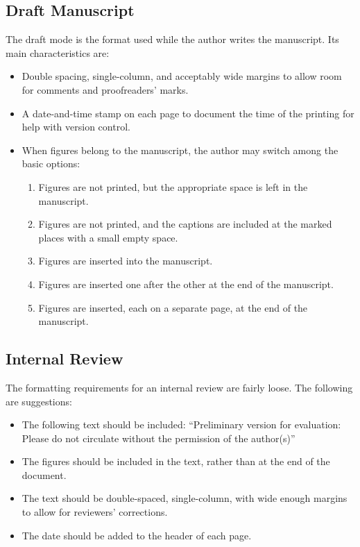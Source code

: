 \documentclass[%
	final,
	notitlepage,
	narroweqnarray,
	inline,
	twoside,
	]{ieee}
\begin{document}
\subsection{Draft Manuscript}

The draft mode is the format used while the author writes the manuscript. 
Its main characteristics are:
\begin{itemize}
\item Double spacing, single-column, and acceptably wide margins to allow room for comments and proofreaders' marks.
\item A date-and-time stamp on each page to document the time of the
      printing for help with version control.
\item When figures belong to the manuscript, the author may switch
      among the basic options:
      \begin{enumerate}
      \item Figures are not printed, but the appropriate space is
            left in the manuscript.
      \item Figures are not printed, and the captions are
            included at the marked places with a small empty space.
      \item Figures are inserted into the manuscript.
      \item Figures are inserted one after the other at the end of the
            manuscript. 
      \item Figures are inserted, each on a separate page, at the end of the
            manuscript. 
      \end{enumerate}
\end{itemize}

\subsection{Internal Review}
The formatting requirements for an internal review are fairly loose.
The following are suggestions:
\begin{itemize}
\item The following text should be included:
      ``Preliminary version for evaluation: Please do not circulate 
      without the permission of the author(s)''
\item The figures should be included in the text, rather than at the
      end of the document. 
\item The text should be double-spaced, single-column, with wide enough 
      margins to allow for reviewers' corrections.
\item The date should be added to the header of each page. 
\end{itemize}
\end{document}
